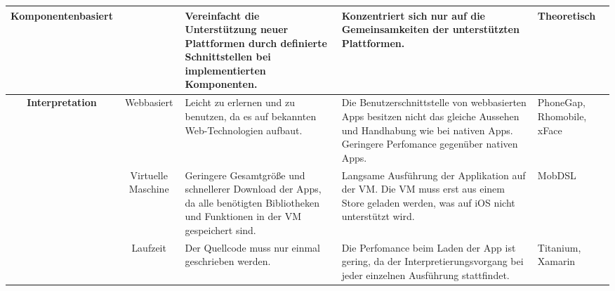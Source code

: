\begin{table}[htbp]
{\begin{tabular}{|c|c|p{8cm}|p{6cm}|p{}|}
			\textbf{Komponentenbasiert}            &                                             & Vereinfacht die Unterstützung neuer Plattformen durch definierte Schnittstellen bei implementierten Komponenten.                                                                                                                                                                                                                 & Konzentriert sich nur auf die Gemeinsamkeiten der unterstützten Plattformen.                                                                                                                           & Theoretisch                                                                                                                                        \\ \hline
			\textbf{Interpretation}                & Webbasiert                                  & Leicht zu erlernen und zu benutzen, da es auf bekannten Web-Technologien aufbaut.                                                                                                                                                                                                                                                & Die Benutzerschnittstelle von webbasierten Apps besitzen nicht das gleiche Aussehen und Handhabung wie bei nativen Apps. Geringere Perfomance gegenüber nativen Apps.                                  & PhoneGap, Rhomobile, xFace                                            \\ \hline
			\textbf{}                              & Virtuelle Maschine                          & Geringere Gesamtgröße und schnellerer Download der Apps, da alle benötigten Bibliotheken und Funktionen in der VM gespeichert sind.                                                                                                                                                                                              & Langsame Ausführung der Applikation auf der VM. Die VM muss erst aus einem Store geladen werden, was auf iOS nicht unterstützt wird.                                                                   & MobDSL                                                                                                                                               \\ \hline
			\textbf{}                              & Laufzeit                                    & Der Quellcode muss nur einmal geschrieben werden.                                                                                                                                                                                                                                                                                & Die Perfomance beim Laden der App ist gering, da der Interpretierungsvorgang bei jeder einzelnen Ausführung stattfindet.                                                                               & Titanium, Xamarin                                        \\ \hline

\end{tabular}}
\end{table}

